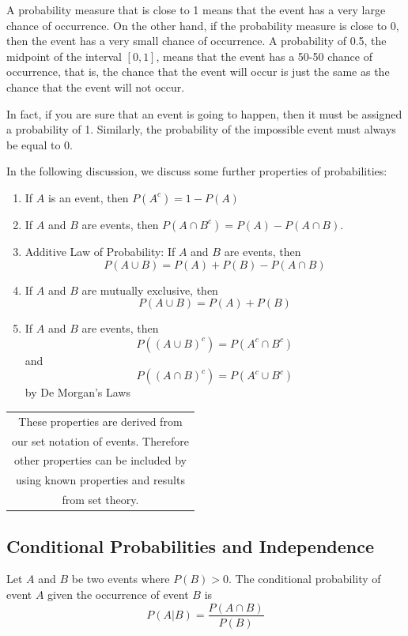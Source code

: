\documentclass{article}
\begin{document}
A probability measure that is close to 1 means that the event has a very large chance of occurrence. On the other hand, if the probability measure is close to 0, then the event has a very small chance of occurrence. A probability of 0.5, the midpoint of the interval $[0,1]$, means that the event has a 50-50 chance of occurrence, that is, the chance that the event will occur is just the same as the chance that the event will not occur.

In fact, if you are sure that an event is going to happen, then it must be assigned a probability of 1. Similarly, the probability of the impossible event must always be equal to 0. 

In the following discussion, we discuss some further properties of probabilities:

\begin{enumerate}
    \item If $A$ is an event, then $P(A^c) = 1 - P(A)$
    \item If $A$ and $B$ are events, then $P(A \cap B^c) = P(A)-P(A \cap B)$. 
    \item Additive Law of Probability: If $A$ and $B$ are events, then $$P(A \cup B) = P(A) + P(B) - P(A \cap B)$$
    \item If $A$ and $B$ are mutually exclusive, then $$P(A \cup B) = P(A) + P(B)$$
    \item If $A$ and $B$ are events, then $$P((A \cup B)^c) = P(A^c \cap B^c)$$ and $$P((A \cap B)^c) = P(A^c \cup B^c)$$ by De Morgan's Laws 
\end{enumerate}

\begin{margintable}
\begin{tabular}{c} 
    These properties are derived from \\
    our set notation of events. Therefore \\
    other properties can be included by \\
    using known properties and results \\
    from set theory.
\end{tabular}
\end{margintable}

\subsection{Conditional Probabilities and Independence}

Let $A$ and $B$ be two events where $P(B)>0$. The conditional probability of event $A$ given the occurrence of event $B$ is
$$
P(A|B) = \frac{P(A \cap B)}{P(B)}
$$
\end{document}
